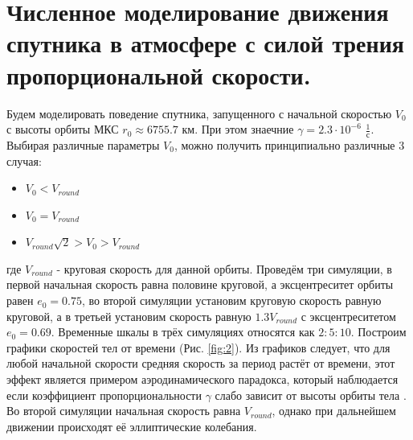 \documentclass[12pt]{article}
\begin{document}
\section{Численное моделирование движения спутника в атмосфере с силой трения пропорциональной скорости.}
Будем моделировать поведение спутника, запущенного с начальной скоростью $V_0$ с высоты орбиты МКС $r_0 \approx 6755.7$ км. При этом знаечние 
$\gamma = 2.3 \cdot 10^{-6}$ $\frac{1}{\textrm{с}}$. Выбирая различные параметры $V_0$, можно получить принципиально различные 3 случая:
\begin{itemize}
    \item $V_0 < V_{round}$
    \item $V_0 = V_{round}$
    \item $V_{round}\sqrt{2} > V_0 > V_{round}$
\end{itemize}
где $V_{round}$ - круговая скорость для данной орбиты.
Проведём три симуляции, в первой начальная скорость равна половине круговой, а эксцентреситет орбиты равен $e_0 = 0.75$, во второй симуляции установим
круговую скорость равную круговой, а в третьей установим скорость равную $1.3V_{round}$ с эксцентреситетом $e_0 = 0.69$. Временные шкалы в трёх 
симуляциях относятся как $2:5:10$.
Построим графики скоростей тел от времени (Рис. \ref{fig:2}). Из графиков следует, что для любой начальной скорости средняя скорость за период
растёт от времени, этот эффект является примером аэродинамического парадокса, который наблюдается если коэффициент пропорциональности $\gamma$ 
слабо зависит от высоты орбиты тела \cite{Kvant}. 
Во второй симуляции начальная скорость равна $V_{round}$, однако при дальнейшем движении происходят её эллиптические колебания.
\end{document}
